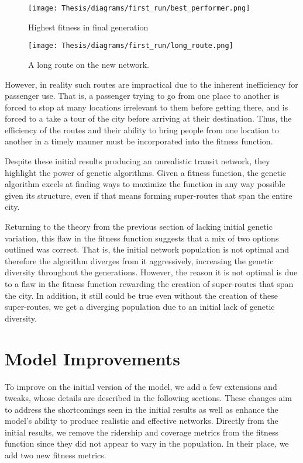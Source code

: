 \documentclass[11pt]{amsart}
\theoremstyle{definition}                  %
\theoremstyle{remark}                       %
\numberwithin{equation}{section}
\begin{document}
\begin{figure}[h]
\centering
\begin{minipage}{.5\textwidth}
  \centering
  \texttt{[image: Thesis/diagrams/first\_run/best\_performer.png]}
  \caption{Highest fitness in final generation}
  \label{fig:first_run:best_performer}
\end{minipage}%
\begin{minipage}{.5\textwidth}
  \centering
  \texttt{[image: Thesis/diagrams/first\_run/long\_route.png]}
  \caption{A long route on the new network.}
  \label{fig:firt_run:long_route}
\end{minipage}
\end{figure}
However, in reality such routes are impractical due to the inherent inefficiency for passenger use. That is, a passenger trying to go from one place to another is forced to stop at many locations irrelevant to them before getting there, and is forced to a take a tour of the city before arriving at their destination. Thus, the efficiency of the routes and their ability to bring people from one location to another in a timely manner must be incorporated into the fitness function. 

Despite these initial results producing an unrealistic transit network, they highlight the power of genetic algorithms. Given a fitness function, the genetic algorithm excels at finding ways to maximize the function in any way possible given its structure, even if that means forming super-routes that span the entire city. 

Returning to the theory from the previous section of lacking initial genetic variation, this flaw in the fitness function suggests that a mix of two options outlined was correct. That is, the initial network population is not optimal and therefore the algorithm diverges from it aggressively, increasing the genetic diversity throughout the generations. However, the reason it is not optimal is due to a flaw in the fitness function rewarding the creation of super-routes that span the city. In addition, it still could be true even without the creation of these super-routes, we get a diverging population due to an initial lack of genetic diversity. 

\section{Model Improvements} 
To improve on the initial version of the model, we add a few extensions and tweaks, whose details are described in the following sections. These changes aim to address the shortcomings seen in the initial results as well as enhance the model's ability to produce realistic and effective networks. Directly from the initial results, we remove the ridership and coverage metrics from the fitness function since they did not appear to vary in the population. In their place, we add two new fitness metrics. 
\end{document}
